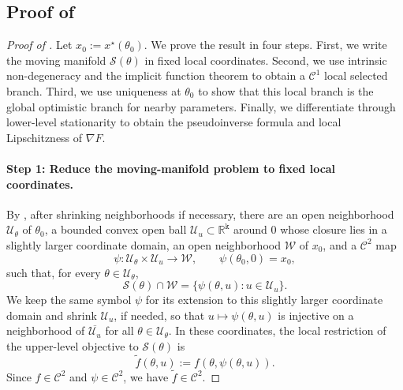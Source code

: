 \documentclass{article}
\theoremstyle{normaltheorem}
\newcommand{\dimk}{\texttt{k}}
\newcommand{\R}{\mathbb{R}}
\newcommand{\calS}{\mathcal{S}}
\begin{document}
\subsection{Proof of }
\begin{proof}[Proof of ]
Let \(x_0:=x^\star(\theta_0)\). We prove the result in four steps. First, we write the
moving manifold \(\calS(\theta)\) in fixed local coordinates. Second, we use intrinsic non-degeneracy and the implicit
function theorem to obtain a \(\mathcal C^1\) local selected branch. Third, we use uniqueness at \(\theta_0\) to show that
this local branch is the global optimistic branch for nearby parameters. Finally, we differentiate through lower-level
stationarity to obtain the pseudoinverse formula and local Lipschitzness of \(\nabla F\).

\paragraph{Step 1: Reduce the moving-manifold problem to fixed local coordinates.}
By , after shrinking neighborhoods if necessary, there are an open neighborhood
\(\mathcal U_\theta\) of \(\theta_0\), a bounded convex open ball \(\mathcal U_u\subset\R^{\dimk}\) around \(0\) whose closure
lies in a slightly larger coordinate domain, an open neighborhood \(\mathcal W\) of \(x_0\), and a \(\mathcal C^2\) map
\[
\psi:\mathcal U_\theta\times\mathcal U_u\to\mathcal W,
\qquad
\psi(\theta_0,0)=x_0,
\]
such that, for every \(\theta\in\mathcal U_\theta\),
\[
\calS(\theta)\cap\mathcal W=\{\psi(\theta,u):u\in\mathcal U_u\}.
\]
We keep the same symbol \(\psi\) for its extension to this slightly larger coordinate domain and shrink
\(\mathcal U_u\), if needed, so that \(u\mapsto\psi(\theta,u)\) is injective on a neighborhood of
\(\overline{\mathcal U_u}\) for all \(\theta\in\mathcal U_\theta\). In these coordinates, the local restriction of the
upper-level objective to \(\calS(\theta)\) is
\[
\tilde f(\theta,u):=f(\theta,\psi(\theta,u)).
\]
Since \(f\in\mathcal C^2\) and \(\psi\in\mathcal C^2\), we have \(\tilde f\in\mathcal C^2\).


\end{proof}
\end{document}
